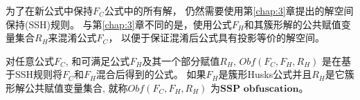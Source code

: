 为了在新公式中保持$F_C$公式中的所有解，
仍然需要使用第\ref{chap:3}章提出的解空间保持(SSH)规则。
与第\ref{chap:3}章不同的是，使用公式$F_H$和其簇形解的公共赋值变量集合$R_H$来混淆公式$F_C$，
以便于保证混淆后公式具有投影等价的解空间。

%

\begin{definition}\label{4:OBFUSCATORSSH}
对任意公式$F_C$, 和可满足公式$F_H$及其一个部分赋值$R_H$,
$Obf(F_C,F_H,R_H)$ 是在基于SSH规则将$F_C$和$F_H$混合后得到的公式。
如果$F_H$是簇形Husks公式并且$R_H$是它簇形解公共赋值变量集合, 就称$Obf(F_C,F_H,R_H)$ 为${\textbf{SSP obfuscation}}$。
\end{definition}

